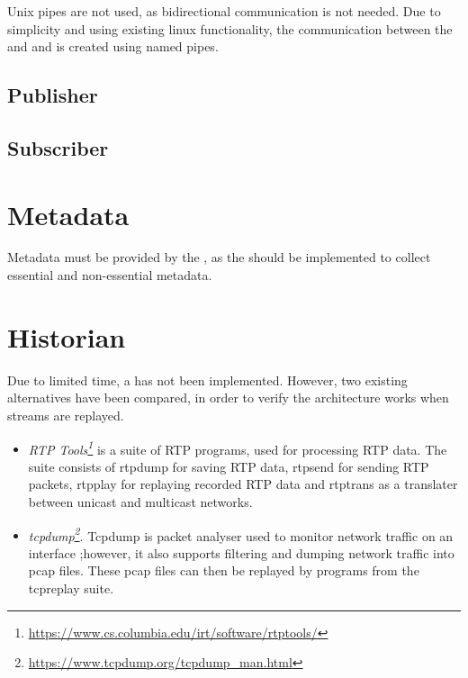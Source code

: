 Unix pipes are not used, as bidirectional communication is not needed. Due to simplicity and using existing linux functionality, the communication between the \pubs{} \subs{} and \con{} and \pro{} is created using named pipes.


\subsection{Publisher}
\subsection{Subscriber}


\section{Metadata}
Metadata must be provided by the \pro{}, as the \pro{} should be implemented to collect essential and non-essential metadata.


\section{Historian}
Due to limited time, a \hist{} has not been implemented. However, two existing alternatives have been compared, in order to verify the architecture works when streams are replayed.

\begin{itemize}
	\item \textit{RTP Tools\footnote{\url{https://www.cs.columbia.edu/irt/software/rtptools/}}} is a suite of RTP programs, used for processing RTP data. The suite consists of rtpdump for saving RTP data, rtpsend for sending RTP packets, rtpplay for replaying recorded RTP data and rtptrans as a translater between unicast and multicast networks.
	
	\item \textit{tcpdump\footnote{\url{https://www.tcpdump.org/tcpdump_man.html}}}. Tcpdump is packet analyser used to monitor network traffic on an interface ;however, it also supports filtering and dumping network traffic into pcap files. These pcap files can then be replayed by programs from the tcpreplay suite.
\end{itemize}

